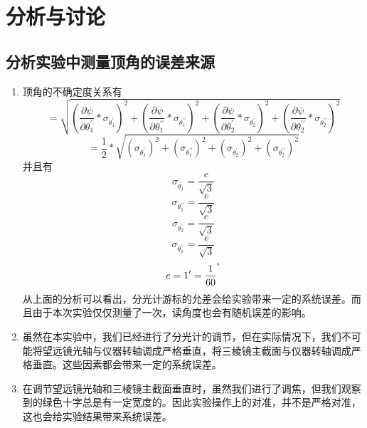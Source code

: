 \documentclass[a4paper,11pt]{article}
\begin{document}
\section{分析与讨论}
\subsection{分析实验中测量顶角的误差来源}
\begin{enumerate}
	\item 顶角的不确定度关系有
	$$ = \sqrt{(\dfrac{\partial \psi}{\partial \theta_{1}^{\prime }} * \sigma_{\theta_{1}^{\prime }})^{2} + (\dfrac{\partial \psi}{\partial \theta_{1}^{\prime \prime}} * \sigma_{\theta_{1}^{\prime \prime}})^{2} + (\dfrac{\partial \psi}{\partial \theta_{2}^{\prime }} * \sigma_{\theta_{2}^{\prime }})^{2} + (\dfrac{\partial \psi}{\partial \theta_{2}^{\prime \prime}} * \sigma_{\theta_{2}^{\prime \prime}})^{2} }$$
	$$ = \frac{1}{2} * \sqrt{(  \sigma_{\theta_{1}^{\prime }})^{2} + (\sigma_{\theta_{1}^{\prime \prime}})^{2} + ( \sigma_{\theta_{2}^{\prime }})^{2} + (\sigma_{\theta_{2}^{\prime \prime}})^{2}} $$
	并且有
	$$ \sigma_{\theta_{1}^{\prime }} = \frac{e}{\sqrt{3}} $$
	$$ \sigma_{\theta_{1}^{\prime \prime}} = \frac{e}{\sqrt{3}} $$
	$$ \sigma_{\theta_{2}^{\prime }} = \frac{e}{\sqrt{3}} $$
	$$ \sigma_{\theta_{1}^{\prime \prime }} = \frac{e}{\sqrt{3}} $$
	$$ e = 1^{\prime} = \frac{1}{60}^{\degree} $$
	从上面的分析可以看出，分光计游标的允差会给实验带来一定的系统误差。而且由于本次实验仅仅测量了一次，读角度也会有随机误差的影响。
	\item 虽然在本实验中，我们已经进行了分光计的调节，但在实际情况下，我们不可能将望远镜光轴与仪器转轴调成严格垂直，将三棱镜主截面与仪器转轴调成严格垂直。这些因素都会带来一定的系统误差。
	\item 在调节望远镜光轴和三棱镜主截面垂直时，虽然我们进行了调焦，但我们观察到的绿色十字总是有一定宽度的。因此实验操作上的对准，并不是严格对准，这也会给实验结果带来系统误差。
	\\
\end{enumerate}
	

	
\end{document}
